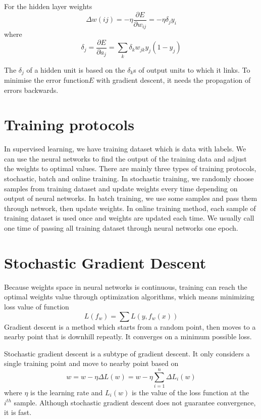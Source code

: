 For the hidden layer weights
\begin{equation}\label{eq:hiddenBP}
\Delta w(ij) = -\eta \frac{\partial E}{\partial w_{ij}} = -\eta \delta_{j}y_{i}
\end{equation}
where $$\delta_{j} = \frac{\partial E}{\partial a_{j}} = \displaystyle\sum_{k} \delta_{k}w_{jk}y_{j}(1 - y_{j})$$

The $\delta_{j}$ of a hidden unit is based on the $\delta_{k}$s of output units to which it links. To minimise the error function$E$ with gradient descent, it needs the propagation of errors backwards.

\section{Training protocols}

In supervised learning, we have training dataset which is data with labels. We can use the neural networks to find the output of the training data and adjust the weights to optimal values. There are mainly  three types of training protocols, stochastic, batch and online training. In stochastic training, we randomly choose samples from training dataset and update weights every time depending on output of neural networks. In batch training, we use some samples and pass them through network, then update weights. In online training method, each sample of training dataset is used once and weights are updated each time. We usually call one time of passing all training dataset through neural networks one epoch.

\section{Stochastic Gradient Descent}

Because weights space in neural networks is continuous, training can reach the optimal weights value through optimization algorithms, which means minimizing loss value of function
\begin{equation}\label{eq:LossMin}
L(f_{w}) = \sum L(y, f_{w}(x))
\end{equation}
Gradient descent is a method which starts from a random point, then moves to a nearby point that is downhill repeatly. It converges on a minimum possible loss.

Stochastic gradient descent is a subtype of gradient descent. It only considers a single training point and move to nearby point based on
\begin{equation}\label{eq:SGDUpdate}
w = w - \eta  \Delta L(w) = w - \eta \sum_{i=1}^{n} \Delta L_{i}(w)
\end{equation}
where $\eta$ is the learning rate and $L_{i}(w)$ is the value of the loss function at the $i^{th}$ sample. Although stochastic gradient descent does not guarantee convergence, it is fast.


